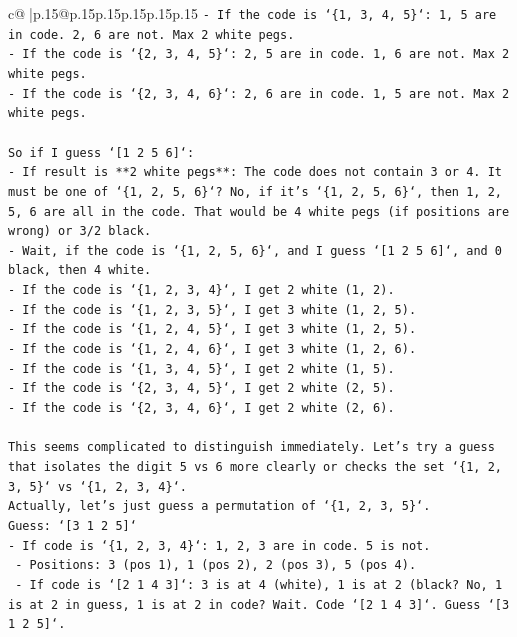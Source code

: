 \documentclass{article}
\begin{document}
{\begin{supertabular}{c@{$\;$}|p{.15\linewidth}@{}p{.15\linewidth}p{.15\linewidth}p{.15\linewidth}p{.15\linewidth}p{.15\linewidth}}
{{{\texttt{{-} If the code is `\{1, 3, 4, 5\}`: 1, 5 are in code. 2, 6 are not. Max 2 white pegs.} \\
\texttt{{-} If the code is `\{2, 3, 4, 5\}`: 2, 5 are in code. 1, 6 are not. Max 2 white pegs.} \\
\texttt{{-} If the code is `\{2, 3, 4, 6\}`: 2, 6 are in code. 1, 5 are not. Max 2 white pegs.} \\
\\ 
\texttt{So if I guess `{[}1 2 5 6{]}`:} \\
\texttt{{-} If result is **2 white pegs**: The code does not contain 3 or 4. It must be one of `\{1, 2, 5, 6\}`? No, if it's `\{1, 2, 5, 6\}`, then 1, 2, 5, 6 are all in the code. That would be 4 white pegs (if positions are wrong) or 3/2 black.} \\
\texttt{{-} Wait, if the code is `\{1, 2, 5, 6\}`, and I guess `{[}1 2 5 6{]}`, and 0 black, then 4 white.} \\
\texttt{{-} If the code is `\{1, 2, 3, 4\}`, I get 2 white (1, 2).} \\
\texttt{{-} If the code is `\{1, 2, 3, 5\}`, I get 3 white (1, 2, 5).} \\
\texttt{{-} If the code is `\{1, 2, 4, 5\}`, I get 3 white (1, 2, 5).} \\
\texttt{{-} If the code is `\{1, 2, 4, 6\}`, I get 3 white (1, 2, 6).} \\
\texttt{{-} If the code is `\{1, 3, 4, 5\}`, I get 2 white (1, 5).} \\
\texttt{{-} If the code is `\{2, 3, 4, 5\}`, I get 2 white (2, 5).} \\
\texttt{{-} If the code is `\{2, 3, 4, 6\}`, I get 2 white (2, 6).} \\
\\ 
\texttt{This seems complicated to distinguish immediately. Let's try a guess that isolates the digit 5 vs 6 more clearly or checks the set `\{1, 2, 3, 5\}` vs `\{1, 2, 3, 4\}`.} \\
\texttt{Actually, let's just guess a permutation of `\{1, 2, 3, 5\}`.} \\
\texttt{Guess: `{[}3 1 2 5{]}`} \\
\texttt{{-} If code is `\{1, 2, 3, 4\}`: 1, 2, 3 are in code. 5 is not.} \\
\texttt{  {-} Positions: 3 (pos 1), 1 (pos 2), 2 (pos 3), 5 (pos 4).} \\
\texttt{  {-} If code is `{[}2 1 4 3{]}`: 3 is at 4 (white), 1 is at 2 (black? No, 1 is at 2 in guess, 1 is at 2 in code? Wait. Code `{[}2 1 4 3{]}`. Guess `{[}3 1 2 5{]}`.} \\
}}}
\end{supertabular}}
\end{document}
